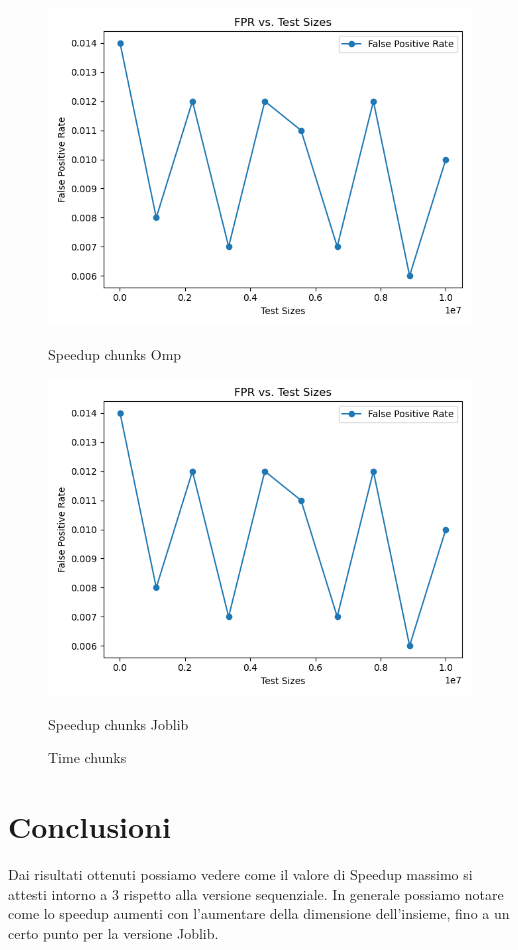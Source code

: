 \documentclass[11pt]{article}
\begin{document}
    \begin{figure}[H]
        \centering
        \includegraphics[width=\linewidth]{plot_chunks_fpr}
            \caption{Speedup chunks Omp}\label{fig:chunks_fpr_omp}
        \endminipage\hfill
        \includegraphics[width=\linewidth]{plot_chunks_fpr}
            \caption{Speedup chunks Joblib}\label{fig:chunks_fpr_joblib}
        \endminipage\hfill
        \caption{Time chunks}
    \end{figure}

    \section{Conclusioni}\label{sec:conclusioni}
    Dai risultati ottenuti possiamo vedere come il valore di Speedup massimo si attesti intorno a 3 rispetto alla versione sequenziale.
    In generale possiamo notare come lo speedup aumenti con l'aumentare della dimensione dell'insieme, fino a un certo punto per la versione Joblib.
\end{document}
